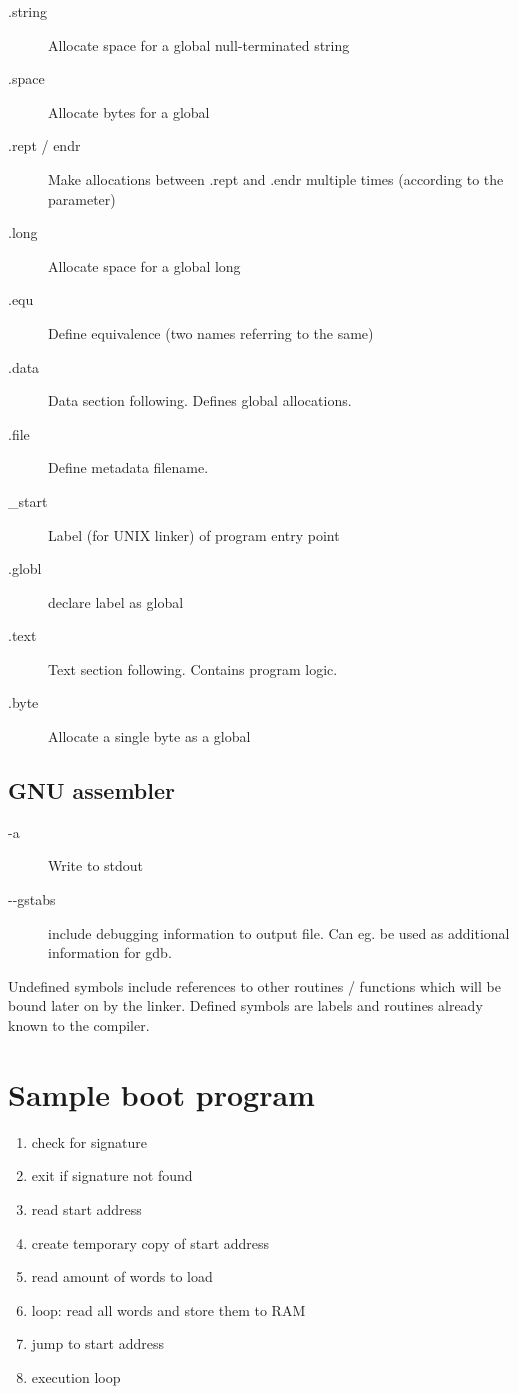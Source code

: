 \documentclass[a4paper,twocolumn]{article}
\begin{document}
\begin{description}
  \item[.string]      Allocate space for a global null-terminated string
  \item[.space]       Allocate bytes for a global
  \item[.rept / endr] Make allocations between .rept and .endr
                      multiple times (according to the parameter)
  \item[.long]        Allocate space for a global long
  \item[.equ]         Define equivalence (two names referring to the same)
  \item[.data]        Data section following. Defines global allocations.
  \item[.file]        Define metadata filename.
  \item[\_start]      Label (for UNIX linker) of program entry point
  \item[.globl]       declare label as global
  \item[.text]        Text section following. Contains program logic.
  \item[.byte]        Allocate a single byte as a global
\end{description}

\subsection{GNU assembler}

\begin{description}
  \item[-a] Write to stdout
  \item[{-}-gstabs] include debugging information to output file.
                  Can eg. be used as additional information for gdb.
\end{description}

Undefined symbols include references to other routines / functions
which will be bound later on by the linker. Defined symbols are labels
and routines already known to the compiler.

\section{Sample boot program}

\begin{enumerate}
  \item check for signature
  \item exit if signature not found
  \item read start address
  \item create temporary copy of start address
  \item read amount of words to load
  \item loop: read all words and store them to RAM
  \item jump to start address
  \item execution loop
\end{enumerate}
\end{document}
